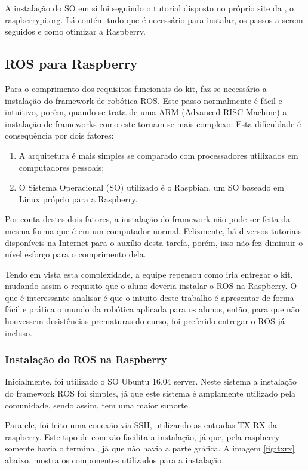 A instalação do SO em si foi seguindo o tutorial disposto no próprio site da \cite{RASPB}, o raspberrypi.org. Lá contém tudo que é necessário para instalar, os passos a serem seguidos e como otimizar a Raspberry.
\subsection{ROS para Raspberry}
Para o comprimento dos requisitos funcionais do kit, faz-se necessário a instalação do framework de robótica ROS. Este passo normalmente é fácil e intuitivo, porém, quando se trata de uma ARM (Advanced RISC Machine) a instalação de frameworks como este tornam-se mais complexo. Esta dificuldade é consequência por dois fatores:

\begin{enumerate}
	\item A arquitetura é mais simples se comparado com processadores utilizados em computadores pessoais;
	\item O Sistema Operacional (SO) utilizado é o Raspbian, um SO baseado em Linux próprio para a Raspberry. 
\end{enumerate}

Por conta destes dois fatores, a instalação do framework não pode ser feita da mesma forma que é em um computador normal. Felizmente, há diversos tutoriais disponíveis na Internet para o auxílio desta tarefa, porém, isso não fez diminuir o nível esforço para o comprimento dela. 

Tendo em vista esta complexidade, a equipe repensou como iria entregar o kit, mudando assim o requisito que o aluno deveria instalar o ROS na Raspberry. O que é interessante analisar é que o intuito deste trabalho é apresentar de forma fácil e prática o mundo da robótica aplicada para os alunos, então, para que não houvessem desistências prematuras do curso, foi preferido entregar o ROS já incluso.
\subsubsection{Instalação do ROS na Raspberry}

Inicialmente, foi utilizado o SO Ubuntu 16.04 server. Neste sistema a instalação do framework ROS foi simples, já que este sistema é amplamente utilizado pela comunidade, sendo assim, tem uma maior suporte.

Para ele, foi feito uma conexão via SSH, utilizando as entradas TX-RX da raspberry. Este tipo de conexão facilita a instalação, já que, pela raspberry somente havia o terminal, já que não havia a parte gráfica. A imagem \ref{fig:txrx} abaixo, mostra os componentes utilizados para a instalação.

